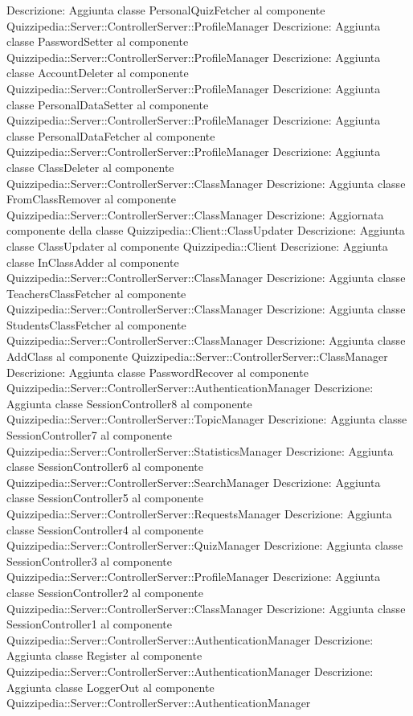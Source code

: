 Descrizione: Aggiunta classe PersonalQuizFetcher al componente Quizzipedia::Server::ControllerServer::ProfileManager 
Descrizione: Aggiunta classe PasswordSetter al componente Quizzipedia::Server::ControllerServer::ProfileManager 
Descrizione: Aggiunta classe AccountDeleter al componente Quizzipedia::Server::ControllerServer::ProfileManager 
Descrizione: Aggiunta classe PersonalDataSetter al componente Quizzipedia::Server::ControllerServer::ProfileManager 
Descrizione: Aggiunta classe PersonalDataFetcher al componente Quizzipedia::Server::ControllerServer::ProfileManager 
Descrizione: Aggiunta classe ClassDeleter al componente Quizzipedia::Server::ControllerServer::ClassManager 
Descrizione: Aggiunta classe FromClassRemover al componente Quizzipedia::Server::ControllerServer::ClassManager 
Descrizione: Aggiornata componente della classe Quizzipedia::Client::ClassUpdater 
Descrizione: Aggiunta classe ClassUpdater al componente Quizzipedia::Client 
Descrizione: Aggiunta classe InClassAdder al componente Quizzipedia::Server::ControllerServer::ClassManager 
Descrizione: Aggiunta classe TeachersClassFetcher al componente Quizzipedia::Server::ControllerServer::ClassManager 
Descrizione: Aggiunta classe StudentsClassFetcher al componente Quizzipedia::Server::ControllerServer::ClassManager 
Descrizione: Aggiunta classe AddClass al componente Quizzipedia::Server::ControllerServer::ClassManager 
Descrizione: Aggiunta classe PasswordRecover al componente Quizzipedia::Server::ControllerServer::AuthenticationManager 
Descrizione: Aggiunta classe SessionController8 al componente Quizzipedia::Server::ControllerServer::TopicManager 
Descrizione: Aggiunta classe SessionController7 al componente Quizzipedia::Server::ControllerServer::StatisticsManager 
Descrizione: Aggiunta classe SessionController6 al componente Quizzipedia::Server::ControllerServer::SearchManager 
Descrizione: Aggiunta classe SessionController5 al componente Quizzipedia::Server::ControllerServer::RequestsManager 
Descrizione: Aggiunta classe SessionController4 al componente Quizzipedia::Server::ControllerServer::QuizManager 
Descrizione: Aggiunta classe SessionController3 al componente Quizzipedia::Server::ControllerServer::ProfileManager 
Descrizione: Aggiunta classe SessionController2 al componente Quizzipedia::Server::ControllerServer::ClassManager 
Descrizione: Aggiunta classe SessionController1 al componente Quizzipedia::Server::ControllerServer::AuthenticationManager 
Descrizione: Aggiunta classe Register al componente Quizzipedia::Server::ControllerServer::AuthenticationManager 
Descrizione: Aggiunta classe LoggerOut al componente Quizzipedia::Server::ControllerServer::AuthenticationManager 
